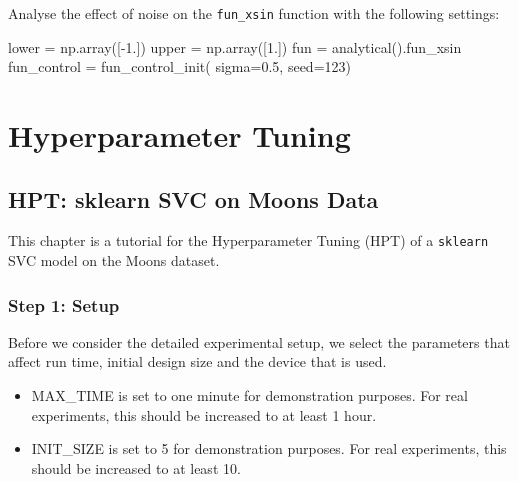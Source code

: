 \documentclass[
  letterpaper,
  DIV=11,
  numbers=noendperiod]{scrreprt}
\newenvironment{Shaded}{\begin{snugshade}}{\end{snugshade}}
\newcommand{\DecValTok}[1]{\textcolor[rgb]{0.68,0.00,0.00}{#1}}
\newcommand{\FloatTok}[1]{\textcolor[rgb]{0.68,0.00,0.00}{#1}}
\newcommand{\NormalTok}[1]{\textcolor[rgb]{0.00,0.23,0.31}{#1}}
\newcommand{\OperatorTok}[1]{\textcolor[rgb]{0.37,0.37,0.37}{#1}}
\providecommand{\tightlist}{%
  \setlength{\itemsep}{0pt}\setlength{\parskip}{0pt}}\usepackage{longtable,booktabs,array}
\begin{document}
Analyse the effect of noise on the \texttt{fun\_xsin} function with the
following settings:

\begin{Shaded}
\begin{Highlighting}[]
\NormalTok{lower }\OperatorTok{=}\NormalTok{ np.array([}\OperatorTok{{-}}\FloatTok{1.}\NormalTok{])}
\NormalTok{upper }\OperatorTok{=}\NormalTok{ np.array([}\FloatTok{1.}\NormalTok{])}
\NormalTok{fun }\OperatorTok{=}\NormalTok{ analytical().fun\_xsin}
\NormalTok{fun\_control }\OperatorTok{=}\NormalTok{ fun\_control\_init(    }
\NormalTok{    sigma}\OperatorTok{=}\FloatTok{0.5}\NormalTok{,}
\NormalTok{    seed}\OperatorTok{=}\DecValTok{123}\NormalTok{)}
\end{Highlighting}
\end{Shaded}

\part{Hyperparameter Tuning}

\hypertarget{sec-hpt-sklearn-svc}{%
\chapter{HPT: sklearn SVC on Moons Data}\label{sec-hpt-sklearn-svc}}

This chapter is a tutorial for the Hyperparameter Tuning (HPT) of a
\texttt{sklearn} SVC model on the Moons dataset.

\hypertarget{sec-setup-10}{%
\section{Step 1: Setup}\label{sec-setup-10}}

Before we consider the detailed experimental setup, we select the
parameters that affect run time, initial design size and the device that
is used.

\begin{tcolorbox}[enhanced jigsaw, left=2mm, title=\textcolor{quarto-callout-caution-color}{\faFire}\hspace{0.5em}{Caution: Run time and initial design size should be increased for real
experiments}, bottomrule=.15mm, titlerule=0mm, breakable, rightrule=.15mm, toprule=.15mm, coltitle=black, colbacktitle=quarto-callout-caution-color!10!white, leftrule=.75mm, arc=.35mm, colframe=quarto-callout-caution-color-frame, bottomtitle=1mm, colback=white, opacitybacktitle=0.6, toptitle=1mm, opacityback=0]

\begin{itemize}
\tightlist
\item
  MAX\_TIME is set to one minute for demonstration purposes. For real
  experiments, this should be increased to at least 1 hour.
\item
  INIT\_SIZE is set to 5 for demonstration purposes. For real
  experiments, this should be increased to at least 10.
\end{itemize}

\end{tcolorbox}
\end{document}
